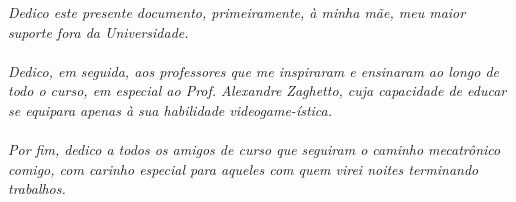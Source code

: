 \emph{Dedico este presente documento, primeiramente, à minha mãe, meu maior suporte fora da Universidade. \\\\Dedico, em seguida, aos professores que me inspiraram e ensinaram ao longo de todo o curso, em especial ao Prof. Alexandre Zaghetto, cuja capacidade de educar se equipara apenas à sua habilidade videogame-ística. \\\\Por fim, dedico a todos os amigos de curso que seguiram o caminho mecatrônico comigo, com carinho especial para aqueles com quem virei noites terminando trabalhos.}